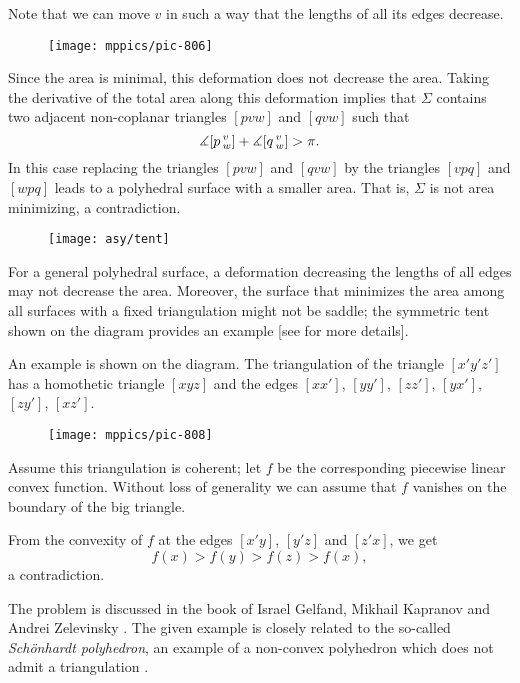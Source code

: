 Note that we can move $v$ in such a way that the lengths of all its edges decrease.

\begin{wrapfigure}{r}{43 mm}
\vskip0mm
\centering
\texttt{[image: mppics/pic-806]}
\end{wrapfigure}

Since the area is minimal,  this deformation does not decrease the area. 
Taking the derivative of the total area along this deformation implies that $\Sigma$
contains two adjacent non-coplanar triangles $[pvw]$ and $[qvw]$ such that
\[\measuredangle [p\,{}^{v}_{w}]+\measuredangle [q\,{}^{v}_{w}]> \pi.\]
In this case replacing the triangles $[pvw]$ and $[qvw]$
by the triangles $[vpq]$ and $[wpq]$
leads to a polyhedral surface with a smaller area.
That is, $\Sigma$ is not area minimizing, a contradiction.
\qeds

{

\begin{wrapfigure}{r}{43 mm}
\vskip-8mm
\centering
\texttt{[image: asy/tent]}
\end{wrapfigure}

For a general polyhedral surface, a deformation decreasing the lengths of all edges may not decrease the area.
Moreover, the surface that minimizes the area among all surfaces with a fixed  triangulation might not be saddle;
the symmetric tent shown on the diagram provides an example [see  for more details].


An example is shown on the diagram.
The triangulation of the triangle $[x'y'z']$ has a homothetic triangle $[xyz]$ and the edges
$[xx']$, $[yy']$, $[zz']$, 
$[yx']$, $[zy']$, $[xz']$.

}

\medskip

\begin{wrapfigure}{r}{33 mm}
\vskip0mm
\centering
\texttt{[image: mppics/pic-808]}
\end{wrapfigure}

Assume this triangulation is coherent;
let $f$ be the corresponding piecewise linear convex function.
Without loss of generality we can assume that $f$ vanishes on the boundary of the big triangle.

From the convexity of $f$ at the edges $[x'y]$,  $[y'z]$ and $[z'x]$, we get 
\[f(x)>f(y)>f(z)>f(x),\]
a contradiction.
\qeds

The problem is discussed in the book of 
Israel Gelfand, 
Mikhail Kapranov 
and Andrei Zelevinsky  \cite[see 7C in][]{GKZ}.
The given example is closely related to the so-called \emph{Sch\"onhardt polyhedron}, an example of a non-convex polyhedron which does not admit a triangulation \cite{schoenhardt}.

